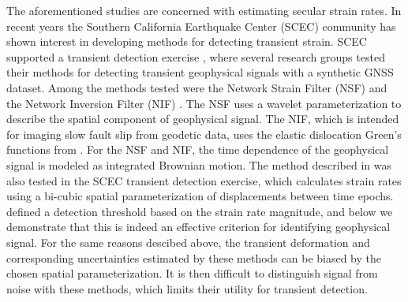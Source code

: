\documentclass[10pt,letter]{article}
\begin{document}
The aforementioned studies are concerned with estimating secular strain rates. In recent years the Southern California Earthquake Center (SCEC) community has shown interest in developing methods for detecting transient strain. SCEC supported a transient detection exercise \citep{Lohman2013}, where several research groups tested their methods for detecting transient geophysical signals with a synthetic GNSS dataset. Among the methods tested were the Network Strain Filter (NSF) \citep{Ohtani2010} and the Network Inversion Filter (NIF) \citep{Segall1997}. The NSF uses a wavelet parameterization to  describe the spatial component of geophysical signal. The NIF, which is intended for imaging slow fault slip from geodetic data, uses the elastic dislocation Green's functions from \citet{Okada1992}. For the NSF and NIF, the time dependence of the geophysical signal is modeled as integrated Brownian motion. The method described in \citet{Holt2013} was also tested in the SCEC transient detection exercise, which calculates strain rates using a bi-cubic spatial parameterization of displacements between time epochs. \citet{Holt2013} defined a detection threshold based on the strain rate magnitude, and below we demonstrate that this is indeed an effective criterion for identifying geophysical signal. For the same reasons descibed above, the transient deformation and corresponding uncertainties estimated by these methods can be biased by the chosen spatial parameterization. It is then difficult to distinguish signal from noise with these methods, which limits their utility for transient detection.   
\end{document}
